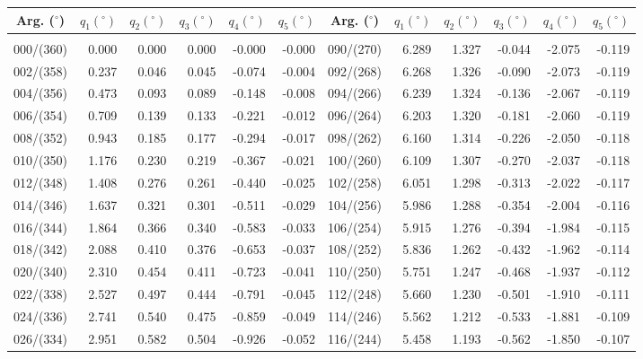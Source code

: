 \newpage
\begin{table}\centering
\small{ \begin{tabular}{crrrrr|crrrrr}
Arg. ($^\circ$) & $q_1(^\circ)$  & $q_2(^\circ)$ & $q_3(^\circ)$ & $q_4(^\circ)$  & $q_5(^\circ)$ &
Arg. ($^\circ$) & $q_1(^\circ)$  & $q_2(^\circ)$ & $q_3(^\circ)$ & $q_4(^\circ)$  & $q_5(^\circ)$  \\\hline
&&&&&&&&&&&\\[-1.75ex]
000/(360) &  0.000 &  0.000 &  0.000 & -0.000 & -0.000 & 090/(270) &  6.289 &  1.327 & -0.044 & -2.075 & -0.119\\
002/(358) &  0.237 &  0.046 &  0.045 & -0.074 & -0.004 & 092/(268) &  6.268 &  1.326 & -0.090 & -2.073 & -0.119\\
004/(356) &  0.473 &  0.093 &  0.089 & -0.148 & -0.008 & 094/(266) &  6.239 &  1.324 & -0.136 & -2.067 & -0.119\\
006/(354) &  0.709 &  0.139 &  0.133 & -0.221 & -0.012 & 096/(264) &  6.203 &  1.320 & -0.181 & -2.060 & -0.119\\
008/(352) &  0.943 &  0.185 &  0.177 & -0.294 & -0.017 & 098/(262) &  6.160 &  1.314 & -0.226 & -2.050 & -0.118\\
010/(350) &  1.176 &  0.230 &  0.219 & -0.367 & -0.021 & 100/(260) &  6.109 &  1.307 & -0.270 & -2.037 & -0.118\\
012/(348) &  1.408 &  0.276 &  0.261 & -0.440 & -0.025 & 102/(258) &  6.051 &  1.298 & -0.313 & -2.022 & -0.117\\
014/(346) &  1.637 &  0.321 &  0.301 & -0.511 & -0.029 & 104/(256) &  5.986 &  1.288 & -0.354 & -2.004 & -0.116\\
016/(344) &  1.864 &  0.366 &  0.340 & -0.583 & -0.033 & 106/(254) &  5.915 &  1.276 & -0.394 & -1.984 & -0.115\\
018/(342) &  2.088 &  0.410 &  0.376 & -0.653 & -0.037 & 108/(252) &  5.836 &  1.262 & -0.432 & -1.962 & -0.114\\
020/(340) &  2.310 &  0.454 &  0.411 & -0.723 & -0.041 & 110/(250) &  5.751 &  1.247 & -0.468 & -1.937 & -0.112\\
022/(338) &  2.527 &  0.497 &  0.444 & -0.791 & -0.045 & 112/(248) &  5.660 &  1.230 & -0.501 & -1.910 & -0.111\\
024/(336) &  2.741 &  0.540 &  0.475 & -0.859 & -0.049 & 114/(246) &  5.562 &  1.212 & -0.533 & -1.881 & -0.109\\
026/(334) &  2.951 &  0.582 &  0.504 & -0.926 & -0.052 & 116/(244) &  5.458 &  1.193 & -0.562 & -1.850 & -0.107\\

\end{tabular}}
\end{table}
